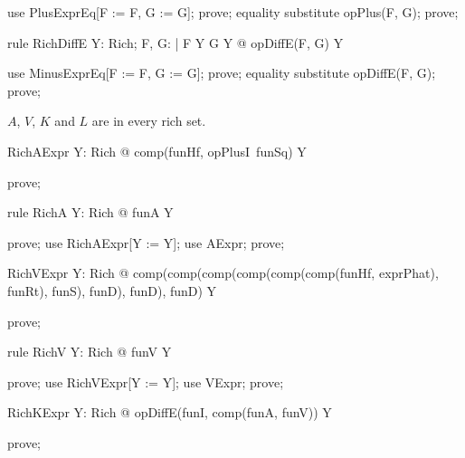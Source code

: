 \documentclass{article}
\begin{document}
\begin{zproof}
use PlusExprEq[F := F, G := G];
prove;
equality substitute opPlus(F, G);
prove;
\end{zproof}

\begin{theorem}{rule RichDiffE}
  \forall Y: Rich; F, G: \nat \fun \nat | F \in Y \land G \in Y @ opDiffE(F, G) \in Y
\end{theorem}

\begin{zproof}
use MinusExprEq[F := F, G := G];
prove;
equality substitute opDiffE(F, G);
prove;
\end{zproof}

$A$, $V$, $K$ and $L$ are in every rich set.

\begin{theorem}{RichAExpr}
  \forall Y: Rich @ comp(funHf, opPlusI~funSq) \in Y
\end{theorem}

\begin{zproof}
prove;
\end{zproof}

\begin{theorem}{rule RichA}
  \forall Y: Rich @ funA \in Y
\end{theorem}

\begin{zproof}
prove;
use RichAExpr[Y := Y];
use AExpr;
prove;
\end{zproof}

\begin{theorem}{RichVExpr}
  \forall Y: Rich @ comp(comp(comp(comp(comp(comp(funHf, exprPhat), funRt), funS), funD), funD), funD) \in Y
\end{theorem}

\begin{zproof}
prove;
\end{zproof}

\begin{theorem}{rule RichV}
  \forall Y: Rich @ funV \in Y
\end{theorem}

\begin{zproof}
prove;
use RichVExpr[Y := Y];
use VExpr;
prove;
\end{zproof}

\begin{theorem}{RichKExpr}
  \forall Y: Rich @ opDiffE(funI, comp(funA, funV)) \in Y
\end{theorem}

\begin{zproof}
prove;
\end{zproof}
\end{document}
